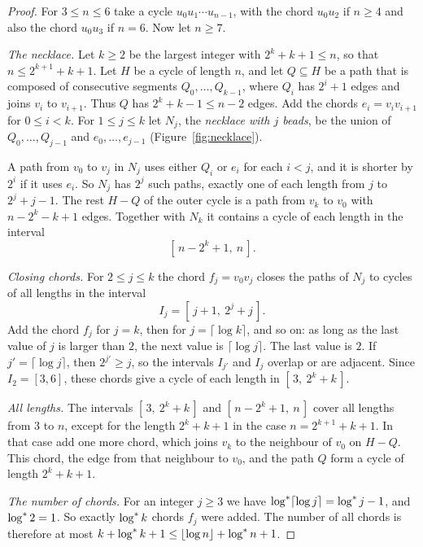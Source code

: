 \begin{proof}
For $3\le n\le6$ take a cycle $u_0u_1\cdots u_{n-1}$, with the chord $u_0u_2$ if $n\ge4$ and also
the chord $u_0u_3$ if $n=6$. Now let $n\ge7$.

\emph{The necklace.} Let $k\ge2$ be the largest integer with $2^{k}+k+1\le n$, so that
$n\le2^{k+1}+k+1$. Let $H$ be a cycle of length $n$, and let $Q\subseteq H$ be a path that is
composed of consecutive segments $Q_0,\dots,Q_{k-1}$, where $Q_i$ has $2^{i}+1$ edges and joins
$v_i$ to $v_{i+1}$. Thus $Q$ has $2^{k}+k-1\le n-2$ edges. Add the chords $e_i=v_iv_{i+1}$ for
$0\le i<k$. For $1\le j\le k$ let $N_j$, the \emph{necklace with $j$ beads}, be the union of
$Q_0,\dots,Q_{j-1}$ and $e_0,\dots,e_{j-1}$ (Figure~\ref{fig:necklace}).

A path from $v_0$ to $v_j$ in $N_j$ uses either $Q_i$ or $e_i$ for each $i<j$, and it is shorter by
$2^{i}$ if it uses $e_i$. So $N_j$ has $2^{j}$ such paths, exactly one of each length from $j$ to
$2^{j}+j-1$. The rest $H-Q$ of the outer cycle is a path from $v_k$ to $v_0$ with $n-2^{k}-k+1$
edges. Together with $N_k$ it contains a cycle of each length in the interval
\[
  [\,n-2^{k}+1,\ n\,].
\]

\emph{Closing chords.} For $2\le j\le k$ the chord $f_j=v_0v_j$ closes the paths of $N_j$ to cycles
of all lengths in the interval
\[
  I_j=[\,j+1,\ 2^{j}+j\,].
\]
Add the chord $f_j$ for $j=k$, then for $j=\lceil\log k\rceil$, and so on: as long as the last
value of $j$ is larger than $2$, the next value is $\lceil\log j\rceil$. The last value is $2$. If
$j'=\lceil\log j\rceil$, then $2^{j'}\ge j$, so the intervals $I_{j'}$ and $I_j$ overlap or are
adjacent. Since $I_2=[3,6]$, these chords give a cycle of each length in $[\,3,\ 2^{k}+k\,]$.

\emph{All lengths.} The intervals $[\,3,\ 2^{k}+k\,]$ and $[\,n-2^{k}+1,\ n\,]$ cover all lengths
from $3$ to $n$, except for the length $2^{k}+k+1$ in the case $n=2^{k+1}+k+1$. In that case add
one more chord, which joins $v_k$ to the neighbour of $v_0$ on $H-Q$. This chord, the edge from that
neighbour to $v_0$, and the path $Q$ form a cycle of length $2^{k}+k+1$.

\emph{The number of chords.} For an integer $j\ge3$ we have $\log^{*}\lceil\log j\rceil=\log^{*} j-1$, and
$\log^{*}2=1$. So exactly $\log^{*} k$ chords $f_j$ were added. The number of all chords is therefore at
most $k+\log^{*} k+1\le\lfloor\log n\rfloor+\log^{*} n+1$.
\end{proof}

